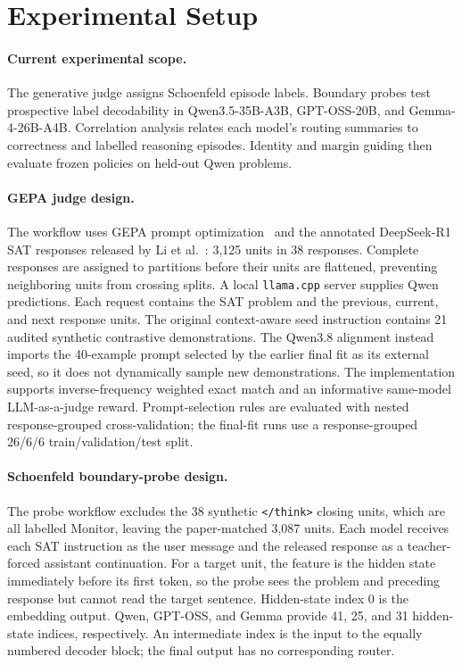 \section{Experimental Setup}

\paragraph{Current experimental scope.}
The generative judge assigns Schoenfeld episode labels. Boundary probes test
prospective label decodability in Qwen3.5-35B-A3B, GPT-OSS-20B, and
Gemma-4-26B-A4B. Correlation analysis relates each model's routing summaries
to correctness and labelled reasoning episodes. Identity and margin guiding
then evaluate frozen policies on held-out Qwen problems.

\paragraph{GEPA judge design.}
The workflow uses GEPA prompt optimization~\cite{agrawal2026gepa}
and the annotated DeepSeek-R1 SAT responses released by
Li et al.~\cite{li2025schoenfeld}: 3,125 units in 38 responses.  Complete responses are assigned to partitions before their
units are flattened, preventing neighboring units from crossing splits.  A
local \texttt{llama.cpp} server supplies Qwen predictions.  Each request
contains the SAT problem and the previous, current, and next response units.
The original context-aware seed instruction contains 21 audited synthetic
contrastive demonstrations.  The Qwen3.8 alignment instead imports the
40-example prompt selected by the earlier final fit as its external seed, so
it does not dynamically sample new demonstrations.  The implementation
supports inverse-frequency weighted exact match and an informative same-model
LLM-as-a-judge reward.  Prompt-selection rules are evaluated with nested
response-grouped cross-validation; the final-fit runs use a response-grouped
26/6/6 train/validation/test split.

\paragraph{Schoenfeld boundary-probe design.}
The probe workflow excludes the 38 synthetic \texttt{</think>} closing units,
which are all labelled Monitor, leaving the paper-matched 3,087 units. Each model
receives each SAT instruction as the user message and the released response as
a teacher-forced assistant continuation.  For a target unit, the feature is
the hidden state immediately before its first token, so the probe sees the
problem and preceding response but cannot read the target sentence.  Hidden-state index 0 is the embedding output. Qwen, GPT-OSS, and Gemma
provide 41, 25, and 31 hidden-state indices, respectively. An intermediate
index is the input to the equally numbered decoder block; the final output
has no corresponding router.

